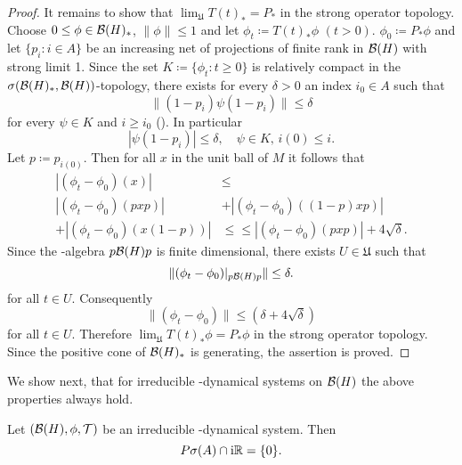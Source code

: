 \begin{proof}
It remains to show that $ \lim_{\mathfrak{U}} T(t)_{*} = P_{*} $  in the strong operator topology.
Choose $ 0 \leq \phi \in \mathcal{B}(H)_{*} $, $ \|\phi\| \leq 1 $  and let $ \phi_{t} \coloneqq T(t)_{*}\phi $  $ (t>0) $.
$ \phi_{0} \coloneqq P_{*}\phi $  and let $ \{p_{i}: i \in A\} $  be an increasing net of projections of finite rank in $ \mathcal{B}(H) $  with strong limit 1.
Since the set $ K \coloneqq \{\phi_{t}: t \geq 0\} $  is relatively compact in the $ \sigma(\mathcal{B}(H)_{*},\mathcal{B}(H)) $-topology, there exists for every $ \delta > 0 $  an index $ i_{0} \in A $  such that
\[
\|(1 - p_{i})\psi(1 - p_{i})\| \leq \delta
\]
for every $ \psi \in K $  and $ i \geq i_{0} $  (\citet[Theorem III.5.4.(vi)]{takesaki:1979}).
In particular
\[
|\psi(1 - p_{i})| \leq \delta, \quad \psi \in K,\, i(0) \leq i.
\]
Let $ p \coloneqq p_{i(0)} $.
Then for all $ x $  in the unit ball of $ M $  it follows that
\begin{align*}
|(\phi_{t} - \phi_{0})(x)| &\leq \\
|(\phi_{t} - \phi_{0})(pxp)| &+ |(\phi_{t} - \phi_{0})((1-p)xp)| \\
+ |(\phi_{t} - \phi_{0})(x(1-p))| &\leq 
\leq |(\phi_{t} - \phi_{0})(pxp)| + 4\sqrt{\delta} .
\end{align*}
Since the \WA-algebra $ p \mathcal{B}(H) p $  is finite dimensional, there exists $ U \in \mathfrak{U} $  such that
\[
	\|(\phi_{t} - \phi_{0})|_{p \mathcal{B}(H) p}\| \leq \delta .
\]
for all $ t \in U $.
Consequently
\[
\|(\phi_{t} - \phi_{0})\| \leq (\delta + 4\sqrt{\delta})
\]
for all $ t \in U $.
Therefore $ \lim_{\mathfrak{U}} T(t)_{*}\phi = P_{*}\phi $  in the strong operator topology.
Since the positive cone of $ \mathcal{B}(H)_{*} $  is generating, the assertion is proved.
\end{proof}
We show next, that for irreducible \WA-dynamical systems on $ \mathcal{B}(H) $  the above properties always hold.
\begin{theorem}\label{thm:d4-3.8}
Let $ (\mathcal{B}(H),\phi,\mathcal{T}) $  be an irreducible \WA-dynamical system.
Then
\[
P\sigma(A) \cap \mathrm{i}\mathbb{R} = \{0\} .
\]

\end{theorem}
